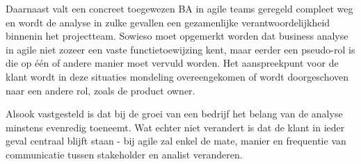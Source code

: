 \documentclass{hogent-article}
\begin{document}
Daarnaast valt een concreet toegewezen BA in agile teams geregeld compleet weg en wordt de analyse in zulke gevallen
een gezamenlijke verantwoordelijkheid binnenin het projectteam. Sowieso moet opgemerkt worden dat business analyse in agile niet zozeer een 
vaste functietoewijzing kent, maar eerder een pseudo-rol is die op één of andere manier moet vervuld worden. Het aanspreekpunt voor de klant wordt in deze
situaties mondeling overeengekomen of wordt doorgeschoven naar een andere rol, zoals de product owner.

Alsook vastgesteld is dat bij de groei van een bedrijf het belang van de analyse minstens evenredig toeneemt. Wat echter niet verandert is dat de klant
in ieder geval centraal blijft staan - bij agile zal enkel de mate, manier en frequentie van communicatie tussen stakeholder en analist veranderen.


\printbibliography[heading=bibintoc]
\end{document}

